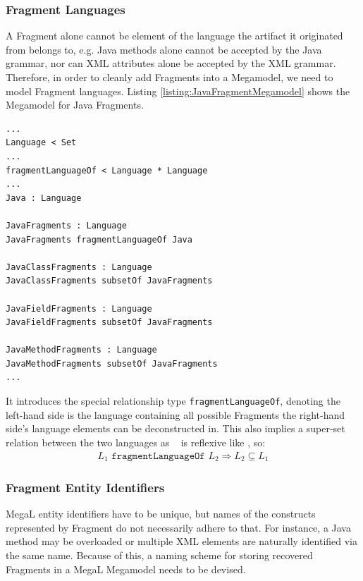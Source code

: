 \subsubsection{Fragment Languages}
\label{subsubsection:FragmentLanguages}
A \gls{Fragment} alone cannot be element of the language the artifact it originated from belongs to, e.g. \gls{Java} methods alone cannot be accepted by the \gls{Java} grammar, nor can \gls{XML} attributes alone be accepted by the \gls{XML} grammar.
Therefore, in order to cleanly add \glspl{Fragment} into a \gls{Megamodel}, we need to model \gls{Fragment} languages.
Listing \ref{listing:JavaFragmentMegamodel} shows the \gls{Megamodel} for \gls{Java} \glspl{Fragment}.
\begin{lstlisting}[caption={A Megamodel for Java Fragment},label={listing:JavaFragmentMegamodel}]
...
Language < Set
...
fragmentLanguageOf < Language * Language
...
Java : Language

JavaFragments : Language
JavaFragments fragmentLanguageOf Java

JavaClassFragments : Language
JavaClassFragments subsetOf JavaFragments

JavaFieldFragments : Language
JavaFieldFragments subsetOf JavaFragments

JavaMethodFragments : Language
JavaMethodFragments subsetOf JavaFragments
...
\end{lstlisting}
It introduces the special relationship type \texttt{fragmentLanguageOf}, denoting the left-hand side is the language containing all possible \glspl{Fragment}  the right-hand side's language elements can be deconstructed in.
This also implies a super-set relation between the two languages as \fragmentOf~ is reflexive like \partOf, so:
\begin{align*}
L_1 \texttt{~fragmentLanguageOf~} L_2 \Rightarrow L_2 \subseteq L_1
\end{align*}

\subsubsection{Fragment Entity Identifiers}
\label{subsubsection:FragmentEntityIdentifiers}
\gls{MegaL} entity identifiers have to be unique, but names of the constructs represented by \gls{Fragment} do not necessarily adhere to that.
For instance, a \gls{Java} method may be overloaded or multiple \gls{XML} elements are naturally identified via the same name.
Because of this, a naming scheme for storing recovered \glspl{Fragment} in a \gls{MegaL} \gls{Megamodel} needs to be devised.

